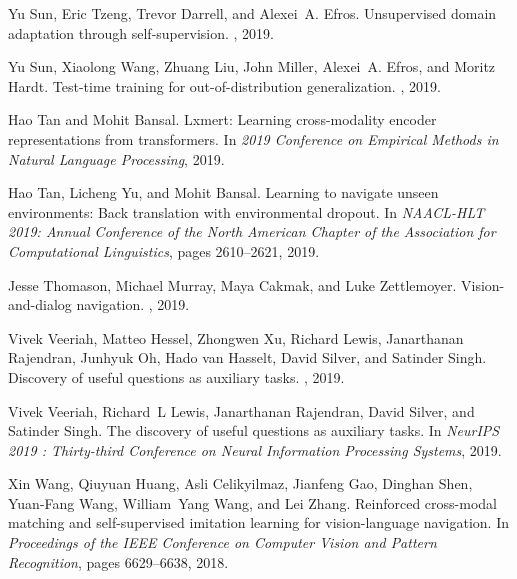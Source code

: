 \documentclass[10pt,twocolumn,letterpaper]{article}
\begin{document}
\begin{thebibliography}{10}
	Yu {Sun}, Eric {Tzeng}, Trevor {Darrell}, and Alexei~A. {Efros}.
	\newblock Unsupervised domain adaptation through self-supervision.
	, 2019.
	
	Yu {Sun}, Xiaolong {Wang}, Zhuang {Liu}, John {Miller}, Alexei~A. {Efros}, and
	Moritz {Hardt}.
	\newblock Test-time training for out-of-distribution generalization.
	, 2019.
	
	Hao {Tan} and Mohit {Bansal}.
	\newblock Lxmert: Learning cross-modality encoder representations from
	transformers.
	\newblock In {\em 2019 Conference on Empirical Methods in Natural Language
		Processing}, 2019.
	
	Hao {Tan}, Licheng {Yu}, and Mohit {Bansal}.
	\newblock Learning to navigate unseen environments: Back translation with
	environmental dropout.
	\newblock In {\em NAACL-HLT 2019: Annual Conference of the North American
		Chapter of the Association for Computational Linguistics}, pages 2610--2621,
	2019.
	
	Jesse {Thomason}, Michael {Murray}, Maya {Cakmak}, and Luke {Zettlemoyer}.
	\newblock Vision-and-dialog navigation.
	, 2019.
	
	Vivek {Veeriah}, Matteo {Hessel}, Zhongwen {Xu}, Richard {Lewis}, Janarthanan
	{Rajendran}, Junhyuk {Oh}, Hado van {Hasselt}, David {Silver}, and Satinder
	{Singh}.
	\newblock Discovery of useful questions as auxiliary tasks.
	, 2019.
	
	Vivek {Veeriah}, Richard~L {Lewis}, Janarthanan {Rajendran}, David {Silver},
	and Satinder {Singh}.
	\newblock The discovery of useful questions as auxiliary tasks.
	\newblock In {\em NeurIPS 2019 : Thirty-third Conference on Neural Information
		Processing Systems}, 2019.
	
	Xin {Wang}, Qiuyuan {Huang}, Asli {Celikyilmaz}, Jianfeng {Gao}, Dinghan
	{Shen}, Yuan-Fang {Wang}, William~Yang {Wang}, and Lei {Zhang}.
	\newblock Reinforced cross-modal matching and self-supervised imitation
	learning for vision-language navigation.
	\newblock In {\em Proceedings of the IEEE Conference on Computer Vision and
		Pattern Recognition}, pages 6629--6638, 2018.
	

\end{thebibliography}
\end{document}
